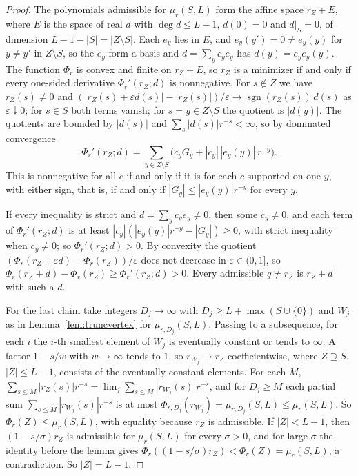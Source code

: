\documentclass[11pt]{article}
\DeclareMathOperator{\sgn}{sgn}
\begin{document}
\begin{proof}
The polynomials admissible for $\mu_r(S,L)$ form the affine space
$r_Z+E$, where $E$ is the space of real $d$ with $\deg d\le L-1$, $d(0)=0$
and $d|_S=0$, of dimension $L-1-|S|=|Z\setminus S|$.  Each $e_y$ lies in
$E$, and $e_y(y')=0\ne e_y(y)$ for $y\ne y'$ in $Z\setminus S$, so the $e_y$
form a basis and $d=\sum_yc_ye_y$ has $d(y)=c_ye_y(y)$.  The function
$\Phi_r$ is convex and finite on $r_Z+E$, so $r_Z$ is a minimizer if and
only if every one-sided derivative $\Phi_r'(r_Z;d)$ is nonnegative.  For
$s\notin Z$ we have $r_Z(s)\ne0$ and
$(|r_Z(s)+\varepsilon d(s)|-|r_Z(s)|)/\varepsilon\to\sgn(r_Z(s))\,d(s)$ as
$\varepsilon\downarrow0$; for $s\in S$ both terms vanish; for
$s=y\in Z\setminus S$ the quotient is $|d(y)|$.  The quotients are bounded
by $|d(s)|$ and $\sum_s|d(s)|r^{-s}<\infty$, so by dominated convergence
\[
  \Phi_r'(r_Z;d)=\sum_{y\in Z\setminus S}\bigl(c_yG_y+|c_y|\,|e_y(y)|\,r^{-y}\bigr).
\]
This is nonnegative for all $c$ if and only if it is for each $c$
supported on one $y$, with either sign, that is, if and only if
$|G_y|\le|e_y(y)|r^{-y}$ for every $y$.

If every inequality is strict and $d=\sum_yc_ye_y\ne0$, then some
$c_y\ne0$, and each term of $\Phi_r'(r_Z;d)$ is at least
$|c_y|(|e_y(y)|r^{-y}-|G_y|)\ge0$, with strict inequality when $c_y\ne0$;
so $\Phi_r'(r_Z;d)>0$.  By convexity the quotient
$(\Phi_r(r_Z+\varepsilon d)-\Phi_r(r_Z))/\varepsilon$ does not decrease in
$\varepsilon\in(0,1]$, so
$\Phi_r(r_Z+d)-\Phi_r(r_Z)\ge\Phi_r'(r_Z;d)>0$.  Every admissible
$q\ne r_Z$ is $r_Z+d$ with such a $d$.

For the last claim take integers $D_j\to\infty$ with
$D_j\ge L+\max(S\cup\{0\})$ and $W_j$ as in Lemma~\ref{lem:truncvertex} for
$\mu_{r,D_j}(S,L)$.  Passing to a subsequence, for each $i$ the $i$-th
smallest element of $W_j$ is eventually constant or tends to $\infty$.  A
factor $1-s/w$ with $w\to\infty$ tends to $1$, so $r_{W_j}\to r_Z$
coefficientwise, where $Z\supseteq S$, $|Z|\le L-1$, consists of the
eventually constant elements.  For each $M$,
$\sum_{s\le M}|r_Z(s)|r^{-s}=\lim_j\sum_{s\le M}|r_{W_j}(s)|r^{-s}$, and for
$D_j\ge M$ each partial sum $\sum_{s\le M}|r_{W_j}(s)|r^{-s}$ is at most
$\Phi_{r,D_j}(r_{W_j})=\mu_{r,D_j}(S,L)\le\mu_r(S,L)$.  So
$\Phi_r(Z)\le\mu_r(S,L)$, with equality because $r_Z$ is admissible.  If
$|Z|<L-1$, then $(1-s/\sigma)r_Z$ is admissible for $\mu_r(S,L)$ for every
$\sigma>0$, and for large $\sigma$ the identity before the lemma gives
$\Phi_r((1-s/\sigma)r_Z)<\Phi_r(Z)=\mu_r(S,L)$, a contradiction.  So
$|Z|=L-1$.
\end{proof}
\end{document}
